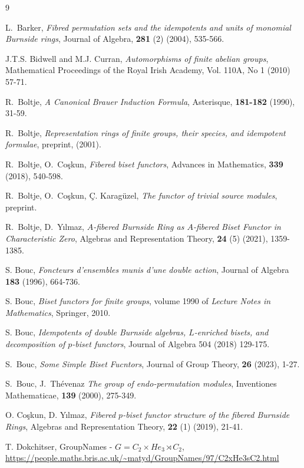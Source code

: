 \documentclass[12pt]{article}
\theoremstyle{plain}
\theoremstyle{definition}
\begin{document}
\begin{thebibliography}{9}%

 L.~Barker, \emph{Fibred permutation sets and the idempotents and units of monomial Burnside rings}, Journal of Algebra, \textbf{281} (2) (2004), 535-566.

 J.T.S. Bidwell and M.J. Curran, \emph{Automorphisms of finite abelian groups}, Mathematical Proceedings of the Royal Irish Academy, Vol. 110A, No 1 (2010) 57-71.

R.~Boltje, \emph{A Canonical Brauer Induction Formula}, Asterisque, \textbf{181-182} (1990), 31-59.

R.~Boltje, \emph{Representation rings of finite groups, their species, and idempotent formulae}, preprint, (2001).

 R.~Boltje, O.~Co\c{s}kun, \emph{Fibered biset functors}, Advances in Mathematics, \textbf{339} (2018), 540-598.

 R.~Boltje, O.~Co\c{s}kun, \c{C}. Karag\"{u}zel, \emph{The functor of trivial source modules}, preprint.

 R.~Boltje, D.~Y\i lmaz, \emph{$A$-fibered Burnside Ring as $A$-fibered Biset Functor in Characteristic Zero}, Algebras and Representation Theory, \textbf{24} (5) (2021), 1359-1385.

 S. Bouc, \emph{Foncteurs d'ensembles munis d'une double action}, Journal of Algebra \textbf{183} (1996), 664-736.

 S. Bouc, \emph{Biset functors for finite groups}, volume 1990 of \emph{Lecture Notes in Mathematics}, Springer, 2010.

  S. Bouc, \emph{Idempotents of double Burnside algebras, $L$-enriched bisets, and decomposition of $p$-biset functors}, Journal of Algebra 504 (2018) 129-175.

 S.~Bouc, \emph{Some Simple Biset Fucntors}, Journal of Group Theory, \textbf{26} (2023), 1-27.

 S.~Bouc, J.~Th\'evenaz \emph{The group of endo-permutation modules}, Inventiones Mathematicae, \textbf{139} (2000), 275-349.

 O. Co\c{s}kun, D. Y\i lmaz, \emph{Fibered $p$-biset functor structure of the fibered Burnside Rings}, Algebras and Representation Theory, \textbf{22} (1) (2019), 21-41.

 T. Dokchitser, GroupNames - $G = C_2\times He_3\rtimes C_2$, \url{https://people.maths.bris.ac.uk/~matyd/GroupNames/97/C2xHe3sC2.html}


\end{thebibliography}
\end{document}
